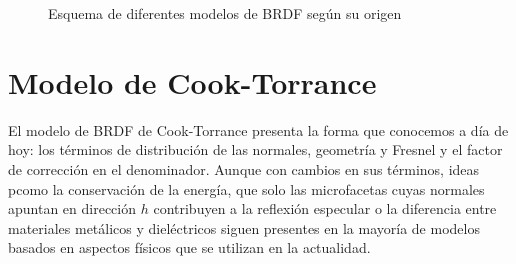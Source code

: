 
    \begin{figure}[H]
        \vspace{0.5cm}
        \centering
        \caption{Esquema de diferentes modelos de BRDF seg\'un su origen}
        \vspace{0.5cm}
    \end{figure}

    \section{Modelo de Cook-Torrance}
    El modelo de BRDF de Cook-Torrance \autocite{cooktorrance} presenta la forma que conocemos a d\'ia de hoy: los t\'erminos
    de distribuci\'on de las normales, geometr\'ia y Fresnel y el factor de correcci\'on en el denominador. Aunque con cambios en
    sus t\'erminos, ideas pcomo la conservaci\'on de la energ\'ia, que solo las microfacetas cuyas normales apuntan en
    direcci\'on $h$ contribuyen a la reflexi\'on especular o la diferencia entre materiales met\'alicos y diel\'ectricos siguen
    presentes en la mayor\'ia de modelos basados en aspectos f\'isicos que se utilizan en la actualidad.

